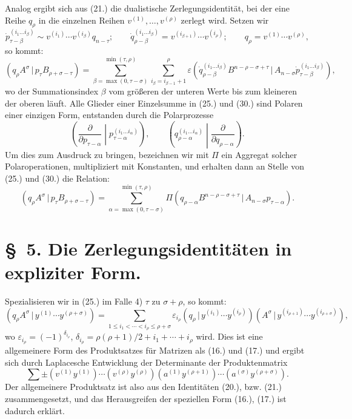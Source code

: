 \documentclass[11pt]{article}
\providecommand{\pair}[2]{(#1\,|\,#2)}
\providecommand{\eps}{\varepsilon}
\begin{document}
Analog ergibt sich aus (21.) die dualistische Zerlegungsidentit\"at, bei der eine Reihe $q_\rho$ in die einzelnen Reihen $v^{(1)},\ldots,v^{(\rho)}$ zerlegt wird. Setzen wir
\begin{equation}
 \dot p_{\tau-\beta}^{(i_1\ldots i_\beta)}\sim v^{(i_1)}\cdots v^{(i_\beta)}q_{n-\tau};\qquad
 \dot q_{\rho-\beta}^{(i_1\ldots i_\beta)}=v^{(i_{\beta+1})}\cdots v^{(i_\rho)};\qquad
 q_\rho=v^{(1)}\cdots v^{(\rho)},
\tag{29}
\end{equation}
so kommt:
\begin{equation}
 \pair{q_\rho A^\sigma}{p_\tau B_{\rho+\sigma-\tau}}
 =\sum_{\beta=\max(0,\tau-\sigma)}^{\min(\tau,\rho)}
   \sum_{i_\beta=i_{\beta-1}+1}^{\rho}\eps
\pair{\dot q_{\rho-\beta}^{(i_1\ldots i_\beta)}B^{n-\rho-\sigma+\tau}}{A_{n-\sigma}\dot p_{\tau-\beta}^{(i_1\ldots i_\beta)}} ,
\tag{30}
\end{equation}
wo der Summationsindex $\beta$ vom gr\"o\ss eren der unteren Werte bis zum kleineren der oberen l\"auft. Alle Glieder einer Einzelsumme in (25.) und (30.) sind Polaren einer einzigen Form, entstanden durch die Polarprozesse
\[
\left(\frac{\partial}{\partial p_{\tau-\alpha}}\middle|p_{\tau-\alpha}^{(i_1\ldots i_\alpha)}\right),\qquad
\left(q_{\rho-\alpha}^{(i_1\ldots i_\alpha)}\middle|\frac{\partial}{\partial q_{\rho-\alpha}}\right).
\]
Um dies zum Ausdruck zu bringen, bezeichnen wir mit $\Pi$ ein Aggregat solcher Polaroperationen, multipliziert mit Konstanten, und erhalten dann an Stelle von (25.) und (30.) die Relation:
\begin{equation}
 \pair{q_\rho A^\sigma}{p_\tau B_{\rho+\sigma-\tau}}
 =\sum_{\alpha=\max(0,\tau-\sigma)}^{\min(\tau,\rho)}
 \Pi\pair{q_{\rho-\alpha}B^{n-\rho-\sigma+\tau}}{A_{n-\sigma}p_{\tau-\alpha}}.
\tag{31}
\end{equation}

\section*{\S\ 5. Die Zerlegungsidentit\"aten in expliziter Form.}
Spezialisieren wir in (25.) im Falle 4) $\tau$ zu $\sigma+\rho$, so kommt:
\begin{equation}
 \pair{q_\rho A^\sigma}{y^{(1)}\cdots y^{(\rho+\sigma)}}
 =\sum_{1\le i_1<\cdots<i_\rho\le \rho+\sigma}
 \eps_{i_\rho}\pair{q_\rho}{y^{(i_1)}\cdots y^{(i_\rho)}}
 \pair{A^\sigma}{y^{(i_{\rho+1})}\cdots y^{(i_{\rho+\sigma})}},
\tag{32}
\end{equation}
wo $\eps_{i_\rho}=(-1)^{\delta_{i_\rho}}$, $\delta_{i_\rho}=\rho(\rho+1)/2+i_1+\cdots+i_\rho$ wird. Dies ist eine allgemeinere Form des Produktsatzes f\"ur Matrizen als (16.) und (17.) und ergibt sich durch Laplacesche Entwicklung der Determinante der Produktenmatrix
\[
 \sum\pm(v^{(1)}y^{(1)})\cdots(v^{(\rho)}y^{(\rho)})(a^{(1)}y^{(\rho+1)})\cdots(a^{(\sigma)}y^{(\rho+\sigma)}).
\]
Der allgemeinere Produktsatz ist also aus den Identit\"aten (20.), bzw. (21.) zusammengesetzt, und das Herausgreifen der speziellen Form (16.), (17.) ist dadurch erkl\"art.
\end{document}
